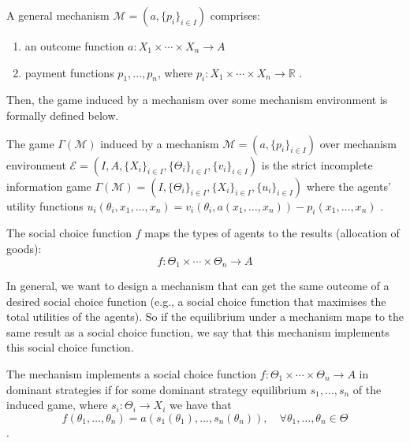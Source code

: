 \documentclass[11pt]{phdthesis}
\begin{document}
\begin{definition} [mechanism]\label{general mechanism}
    A general mechanism $ \mathcal{M} = (a, \{p_i\}_{i \in I}) $ comprises:
    \begin{enumerate}
        \item an outcome function $a : X_1 \times \cdots \times X_n \rightarrow A $
          \item payment functions $p_1,\ldots,p_n$, where $p_i : X_1 \times \cdots \times X_n \rightarrow \mathbb{R}$
          \citep[Definition 9.24]{nisan2007algorithmic}.
      \end{enumerate}
  \end{definition}

  Then, the game induced by a mechanism over some mechanism environment is formally defined below.
  \begin{definition}
      The game $ \Gamma(\mathcal{M}) $ induced by a mechanism $ \mathcal{M} = (a, \{p_i\}_{i \in I}) $ over mechanism environment $ \mathcal{E} = (I, A, \{X_i\}_{i \in I}, \{\Theta_{i}\}_{i \in I}, \{v_i\}_{i \in I}) $ is the strict incomplete information game $ \Gamma(\mathcal{M}) = (I, \{\Theta_{i}\}_{i \in I}, \{X_i\}_{i \in I}, \{u_i\}_{i \in I}) $ where the agents' utility functions $u_i(\theta_i,x_1,\ldots,x_n) = v_i(\theta_i,a(x_1,\ldots,x_n)) - p_i(x_1,\ldots,x_n)$
    \citep[Definition 9.24]{nisan2007algorithmic}.
\end{definition}

\begin{definition}
  The social choice function $f$ maps the types of agents to the results (allocation of goods):
    $$f : \Theta_1 \times \cdots \times \Theta_n \rightarrow A$$ 
  \label{social choice function}
\end{definition}

In general, we want to design a mechanism that can get the same outcome of a desired social choice function (e.g., a social choice function that maximises the total utilities of the agents). So if the equilibrium under a mechanism maps to the same result as a social choice function, we say that this mechanism implements this social choice function.

\begin{definition}[implementation]
    The mechanism implements a social choice function $f : \Theta_1 \times \cdots \times \Theta_n \rightarrow A$ in dominant strategies if for some dominant strategy equilibrium $s_1,\ldots,s_n$ of the induced game, where $s_i: \Theta_i \rightarrow X_i$ we have that
    $$ f(\theta_1,\ldots,\theta_n) = a(s_1(\theta_1),\ldots,s_n(\theta_n)), \quad \forall \theta_1,\ldots,\theta_n \in \Theta $$
    \citep[Definition 9.24]{nisan2007algorithmic}.
\end{definition}
\end{document}
